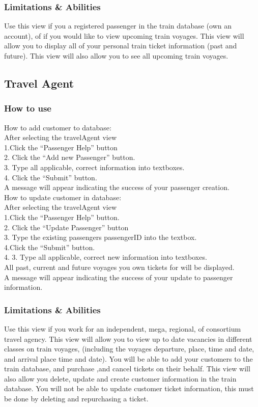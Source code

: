 \documentclass[letter]{article}
\begin{document}
\subsubsection{Limitations \& Abilities}
Use this view if you a registered passenger in the train database (own an account), of if you would like to view upcoming train voyages. This view will allow you to display all of your personal train ticket information (past and future).  This view will also allow you to see all upcoming train voyages.

\subsection{Travel Agent}
\subsubsection{How to use}

How to add customer to database:\\
After selecting the travelAgent view\\
1.Click the “Passenger Help” button\\
2. Click the “Add new Passenger” button. \\
3. Type all applicable, correct information into textboxes.\\
4. Click the “Submit” button.\\
A message will appear indicating the success of your passenger creation.\\


How to update customer in database:\\
After selecting the travelAgent view\\
1.Click the “Passenger Help” button.\\
2. Click the “Update Passenger” button\\
3. Type the existing passengers passengerID into the textbox.\\
4.Click the “Submit” button. \\
4. 3. Type all applicable, correct new information into textboxes.\\
All past, current and future voyages you own tickets for will be displayed. \\
A message will appear indicating the success of your update to passenger information.\\ 


\subsubsection{Limitations \& Abilities}
Use this view if you work for an independent, mega, regional, of consortium travel agency. This view will allow you to view up to date vacancies in different classes on train voyages, (including the voyages departure, place, time and date, and arrival place time and date).  You will be able to add your customers to the train database, and purchase ,and cancel tickets on their behalf. This view will also allow you delete, update and create customer information in the train database. You will not be able to update customer ticket information, this must be done by deleting and repurchasing a ticket. 
\end{document}
